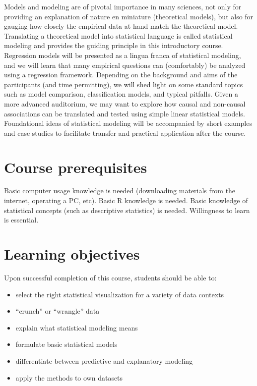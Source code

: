 \documentclass[
  letterpaper,
  DIV=11,
  numbers=noendperiod]{scrreprt}
\providecommand{\tightlist}{%
  \setlength{\itemsep}{0pt}\setlength{\parskip}{0pt}}\usepackage{longtable,booktabs,array}
\theoremstyle{definition}
\theoremstyle{definition}
\theoremstyle{remark}
\begin{document}
Models and modeling are of pivotal importance in many sciences, not only
for providing an explanation of nature en miniature (theoretical
models), but also for gauging how closely the empirical data at hand
match the theoretical model. Translating a theoretical model into
statistical language is called statistical modeling and provides the
guiding principle in this introductory course. Regression models will be
presented as a lingua franca of statistical modeling, and we will learn
that many empirical questions can (comfortably) be analyzed using a
regression framework. Depending on the background and aims of the
participants (and time permitting), we will shed light on some standard
topics such as model comparison, classification models, and typical
pitfalls. Given a more advanced auditorium, we may want to explore how
causal and non-causal associations can be translated and tested using
simple linear statistical models. Foundational ideas of statistical
modeling will be accompanied by short examples and case studies to
facilitate transfer and practical application after the course.

\hypertarget{course-prerequisites}{%
\section*{Course prerequisites}\label{course-prerequisites}}

Basic computer usage knowledge is needed (downloading materials from the
internet, operating a PC, etc). Basic R knowledge is needed. Basic
knowledge of statistical concepts (such as descriptive statistics) is
needed. Willingness to learn is essential.

\hypertarget{learning-objectives}{%
\section*{Learning objectives}\label{learning-objectives}}

Upon successful completion of this course, students should be able to:

\begin{itemize}
\tightlist
\item
  select the right statistical visualization for a variety of data
  contexts
\item
  ``crunch'' or ``wrangle'' data
\item
  explain what statistical modeling means
\item
  formulate basic statistical models
\item
  differentiate between predictive and explanatory modeling
\item
  apply the methods to own datasets
\end{itemize}
\end{document}
